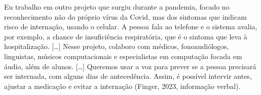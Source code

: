 \begin{citacaoabnt}
Eu trabalho em outro projeto que surgiu durante a pandemia, focado no reconhecimento não do próprio vírus da Covid, mas dos sintomas que indicam risco de internação, usando o celular. A pessoa fala ao telefone e o sistema avalia, por exemplo, a chance de insuficiência respiratória, que é o sintoma que leva à hospitalização. [\ldots] Nesse projeto, colaboro com médicos, fonoaudiólogos, linguistas, músicos computacionais e especialistas em computação focada em áudio, além de alunos. [\ldots] Queremos usar a voz para prever se a pessoa precisará ser internada, com alguns dias de antecedência. Assim, é possível intervir antes, ajustar a medicação e evitar a internação (Finger, 2023, informação verbal).
\end{citacaoabnt}

